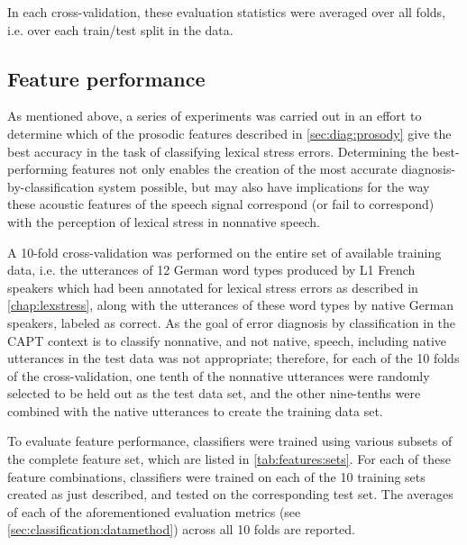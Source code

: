 	In each cross-validation, these evaluation statistics were averaged over all folds, i.e. over each train/test split in the data. 

		
	\subsection{Feature performance }
	\label{sec:classification:features}
	
		As mentioned above, a series of experiments was carried out in an effort to determine which of the prosodic features described in \cref{sec:diag:prosody} give the best accuracy in the task of classifying lexical stress errors. Determining the best-performing features not only enables the creation of the most accurate diagnosis-by-classification system possible, but may also have implications for the way these acoustic features of the speech signal correspond (or fail to correspond) with the perception of lexical stress in nonnative speech. 
		
		A 10-fold cross-validation was performed on the entire set of available training data, i.e. the utterances of 12 German word types produced by L1 French speakers which had been annotated for lexical stress errors as described in \cref{chap:lexstress}, along with the	utterances of these word types by native German speakers, labeled as correct. As the goal of  error diagnosis by classification in the CAPT context is to classify nonnative, and not native, speech, including native utterances in the test data was not appropriate; therefore, for each of the 10 folds of the cross-validation, one tenth of the nonnative utterances were randomly selected to be held out as the test data set, and the other nine-tenths were combined with the native utterances to create the training data set. 
		
		To evaluate feature performance, classifiers were trained using various subsets of the complete feature set,
		which are listed in \cref{tab:features:sets}. For each of these feature combinations, classifiers were trained on each of the 10 training sets created as just described, and tested on the corresponding test set. The averages of each of the aforementioned evaluation metrics (see \cref{sec:classification:datamethod}) across all 10 folds are reported.

